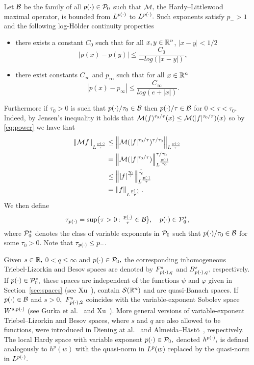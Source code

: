 Let $\B$ be the family of all $\pp \in \P_0$ such that $\M,$  the Hardy--Littlewood maximal operator, is bounded from $\Lp$ to $\Lp.$ Such exponents satisfy $p_- > 1$ and the following log-H\"older continuity properties
\begin{itemize}
\item there exists a constant $C_0$ such that for all $x,y\in \rn$, $|x-y|<1/2$
\[ |p(x)-p(y)| \leq \frac{C_0}{-log(|x-y|)}, \]
\item there exist constants $C_\infty$ and $p_\infty$ such that for all $x\in\rn$ 
\[|p(x) - p_\infty| \leq \frac{C_\infty}{log(e + |x|)}.	 \]
\end{itemize}
Furthermore if 
$\tau_0 >0$ 
is such that 
$p(\cdot)/\tau_0 \in \B$ 
then $\pp/\tau \in \B$ for $0<\tau<\tau_0$. 
Indeed, by Jensen's inequality it holds that 
$\M(f)^{\tau_0/\tau}(x) 
\leq \M(|f|^{\tau_0/\tau})(x)$ 
so by \ref{eq:power} we have that 
\begin{align*}
\norm{\M f}{L^{\frac{p(\cdot)}{\tau}}} &\leq \norm{\M(|f|^{\tau_0/\tau})^{\tau/\tau_0}}{L^{\frac{p(\cdot)}{\tau}}} \\
& = \norm{\M(|f|^{\tau_0/\tau})}{L^{\frac{\pp}{\tau_0} }}^{\tau/\tau_0}\\
& \leq \norm{|f|^{\frac{\tau_0}{\tau}}}{L^{\frac{p(\cdot)}{\tau}}}^{\frac{\tau}{\tau_0}} \\
& = \norm{f}{L^{\frac{p(\cdot)}{\tau}}}.
\end{align*}
We then define
\begin{equation*}
\tau_{\pp}=\sup\{\tau>0:\fr{\pp}{\tau}\in \B\},\quad \pp\in \P_0^*,
\end{equation*}
where $\P_0^*$ denotes the class of variable exponents in $\P_0$ such that $\pp/\tau_0\in\B$ for some $\tau_0>0.$ Note that $\tau_{\pp}\le p_-.$


Given $s\in\re,$ $0<q\le \infty$ and $\pp\in\P_0,$ the corresponding inhomogeneous Triebel-Lizorkin and Besov spaces are denoted by $\itl{\pp}{s}{q}$  and  $\ibes{\pp}{s}{q},$
respectively. If $\pp\in\P_0^*,$ these spaces are independent of the functions $\psi$ and $\varphi$ given in  Section~\ref{sec:spaces} (see  Xu~\cite{MR2431378}), contain $\sw$ and are quasi-Banach spaces. If $\pp\in\B$ and $s>0,$ $\itl{\pp}{s}{2}$ coincides with the variable-exponent  Sobolev space $W^{s,\pp}$ (see Gurka et al.~\cite{MR2339558} and Xu~\cite{MR2449626}). More general versions of variable-exponent  Triebel--Lizorkin and Besov spaces, where $s$ and  $q$ are also allowed to be functions, were introduced in  Diening at al.~\cite{MR2498558} and Almeida--H\"ast\"o~\cite{MR2566313}, respectively. 
The local Hardy space with variable exponent $\pp\in \P_0,$  denoted $h^{\pp},$  is defined analogously to $h^p(w)$ with the quasi-norm in $\lebw{p}{w}$ replaced by the quasi-norm in $\Lp.$ 

